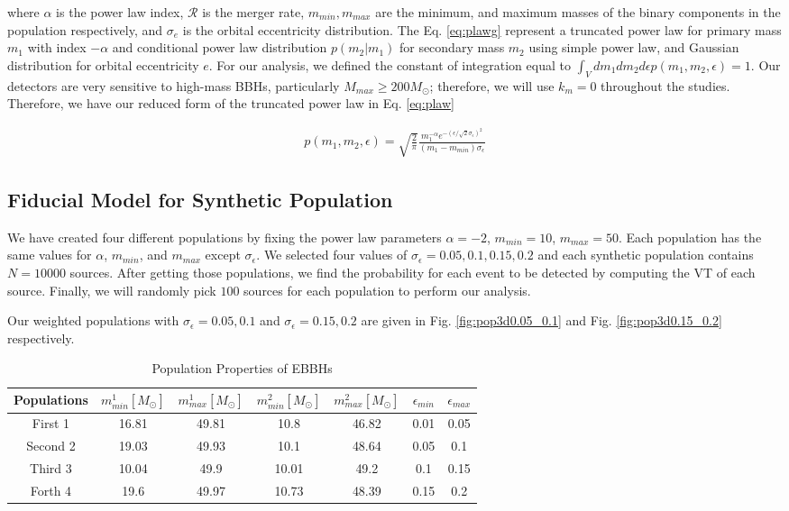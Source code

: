 \documentclass[twocolumn,prd,nofootinbib]{revtex4}
\begin{document}
where $\alpha$ is the power law index, $\mathcal{R}$ is the merger rate, $m_{min}, m_{max}$ are the minimum, and maximum masses of the binary components in the population respectively, and $\sigma_e$ is the orbital eccentricity distribution. The Eq. \ref{eq:plawg} represent a truncated power law for primary mass $m_1$ with index $-\alpha$ and conditional power law distribution $p(m_2|m_1)$ for secondary mass $m_2$ using simple power law, and Gaussian distribution for orbital eccentricity $e$. 
For our analysis, we defined the constant of integration equal to $\int_V dm_1 dm_2 d\epsilon p(m_1,m_2,\epsilon) = 1$.  Our detectors are very sensitive to high-mass BBHs, particularly $M_{max}\geq 200 M_\odot$; therefore, we will use $k_m=0$ throughout the studies. Therefore, we have our reduced form of the truncated power law in Eq. \ref{eq:plaw}

\begin{align}
\label{eq:plaw}
p(m_1,m_2,\epsilon) = \sqrt{\frac{2}{\pi}} \frac{ m_1^{-\alpha}  e^{-(\epsilon/\sqrt{2}\sigma_\epsilon)^2}}{(m_1-m_{min})\sigma_\epsilon}
\end{align}


\subsection{Fiducial Model for Synthetic Population}

We have created four different populations by fixing the
power law parameters $\alpha = -2$, $m_{min} = 10$, $m_{max}=50$. Each population has the same values for $\alpha$, $m_{min}$, and $m_{max}$ except $\sigma_\epsilon$. We selected four values of $\sigma_\epsilon = 0.05,0.1,0.15,0.2$ and each synthetic population contains $N=10000$ sources. After getting those populations, we find the probability for each event to be detected by computing the VT of each source. Finally, we will randomly pick $100$ sources for each population to perform our analysis.

Our weighted populations with $\sigma_\epsilon=0.05, 0.1$ and $\sigma_\epsilon=0.15, 0.2$ are given in Fig. \ref{fig:pop3d0.05_0.1} and Fig. \ref{fig:pop3d0.15_0.2} respectively. 
 

\begin{table}[]
    \centering
    \begin{tabular}{c|cccccc}
        \hline
        Populations & $m^1_{min} [M_\odot] $ & $m^1_{max} [M_\odot]$ & $m^2_{min} [M_\odot]$ & $m^2_{max} [M_\odot]$ & $\epsilon_{min}$ & $\epsilon_{max}$\\ \hline
        First 1 & 16.81 & 49.81 & 10.8 & 46.82 & 0.01 & 0.05\\ \hline
        Second 2 & 19.03 & 49.93 & 10.1 & 48.64 & 0.05 & 0.1\\ \hline
        Third 3 & 10.04 & 49.9 & 10.01 & 49.2 & 0.1 & 0.15\\ \hline
        Forth 4 & 19.6 & 49.97 & 10.73 & 48.39 & 0.15 & 0.2\\ \hline
    \end{tabular}
    \caption{Population Properties of EBBHs}
    \label{tab:pop_prop}
\end{table}
\end{document}
